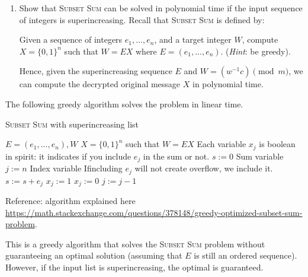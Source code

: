\documentclass[a4paper]{article}
\begin{document}
\begin{enumerate}[resume, label=\roman*)]
	\item Show that \textsc{Subset Sum} can be solved in polynomial time if the input sequence of integers is superincreasing. Recall that \textsc{Subset Sum} is defined by:
	
	Given a sequence of integers $e_1, ..., e_n$, and a target integer $W$, compute $X = \{0, 1\}^n$ such that $W = EX$ where $E = (e_1, ..., e_n)$. (\emph{Hint}: be greedy).
	
	Hence, given the superincreasing sequence $E$ and $W = (w^{-1}c) \pmod{m}$, we can compute the decrypted original message $X$ in polynomial time.
\end{enumerate}

The following greedy algorithm solves the problem in linear time.

\begin{algorithm}[H]
	\caption{\textsc{Subset Sum} with superincreasing list}
\begin{algorithmic}
	\INPUT $E= (e_1, ... , e_n), W $
	\OUTPUT $ X = \{0,1\}^n $ such that $W=EX$
	\State \Comment Each variable $x_j$ is boolean in spirit: it indicates if you include $e_j$ in the sum or not.
	\State $s := 0$ \Comment Sum variable
	\State $j := n$ \Comment Index variable
		 \Comment Ifincluding  $e_j$ will not create overflow, we include it.
			\State $s := s + e_j$
			\State $x_j := 1$
		\Else
			\State $x_j := 0$
		\EndIf
		$ j := j-1 $
	\EndWhile
\end{algorithmic}
\end{algorithm}

Reference: algorithm explained here \rightarrow \url{https://math.stackexchange.com/questions/378148/greedy-optimized-subset-sum-problem}.

This is a greedy algorithm that solves the \textsc{Subset Sum} problem without guaranteeing an optimal solution (assuming that $E$ is still an ordered sequence). However, if the input list is superincreasing, the optimal is guaranteed.
\end{document}
